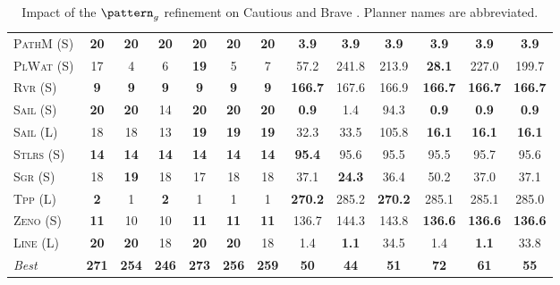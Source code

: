 \begin{table}[tb]
{\begin{tabular}{|l||cccccc||cccccc||}
\textsc{PathM} (S)&\textbf{20}&\textbf{20}&\textbf{20}&\textbf{20}&\textbf{20}&\textbf{20}&\textbf{3.9}&\textbf{3.9}&\textbf{3.9}&\textbf{3.9}&\textbf{3.9}&\textbf{3.9}\\
\textsc{PlWat} (S)&17&4&6&\textbf{19}&5&7&57.2&241.8&213.9&\textbf{28.1}&227.0&199.7\\
\textsc{Rvr} (S)&\textbf{9}&\textbf{9}&\textbf{9}&\textbf{9}&\textbf{9}&\textbf{9}&\textbf{166.7}&167.6&166.9&\textbf{166.7}&\textbf{166.7}&\textbf{166.7}\\
\textsc{Sail} (S)&\textbf{20}&\textbf{20}&14&\textbf{20}&\textbf{20}&\textbf{20}&\textbf{0.9}&1.4&94.3&\textbf{0.9}&\textbf{0.9}&\textbf{0.9}\\
\textsc{Sail} (L)&18&18&13&\textbf{19}&\textbf{19}&\textbf{19}&32.3&33.5&105.8&\textbf{16.1}&\textbf{16.1}&\textbf{16.1}\\
\textsc{Stlrs} (S)&\textbf{14}&\textbf{14}&\textbf{14}&\textbf{14}&\textbf{14}&\textbf{14}&\textbf{95.4}&95.6&95.5&95.5&95.7&95.6\\
\textsc{Sgr} (S)&18&\textbf{19}&18&17&18&18&37.1&\textbf{24.3}&36.4&50.2&37.0&37.1\\
\textsc{Tpp} (L)&\textbf{2}&1&\textbf{2}&1&1&1&\textbf{270.2}&285.2&\textbf{270.2}&285.1&285.1&285.0\\
\textsc{Zeno} (S)&\textbf{11}&10&10&\textbf{11}&\textbf{11}&\textbf{11}&136.7&144.3&143.8&\textbf{136.6}&\textbf{136.6}&\textbf{136.6}\\
\textsc{Line} (L)&\textbf{20}&\textbf{20}&18&\textbf{20}&\textbf{20}&18&1.4&\textbf{1.1}&34.5&1.4&\textbf{1.1}&33.8
\\\hline
\textit{Best}&\textbf{271}&\textbf{254}&\textbf{246}&\textbf{273}&\textbf{256}&\textbf{259}&\textbf{50}&\textbf{44}&\textbf{51}&\textbf{72}&\textbf{61}&\textbf{55}\\\hline

        \end{tabular}}
        \caption{Impact of the $\pattern_g$ refinement on Cautious and Brave \pattyd. Planner names are abbreviated.}
        \label{tab:abl-patterng}
        \end{table}
        